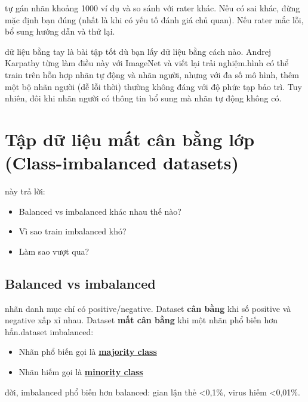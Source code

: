 \documentclass[12pt,a4paper]{article}
\begin{document}
\begin{luuy}[title={Luôn double-check người gán nhãn}] tự gán nhãn khoảng 1000 ví dụ và so sánh với rater khác. Nếu có sai khác, đừng mặc định bạn đúng (nhất là khi có yếu tố đánh giá chủ quan). Nếu rater mắc lỗi, bổ sung hướng dẫn và thử lại.\n\end{luuy}

\begin{ynghia} dữ liệu bằng tay là bài tập tốt dù bạn lấy dữ liệu bằng cách nào. Andrej Karpathy từng làm điều này với ImageNet và viết lại trải nghiệm.\n{} hình có thể train trên hỗn hợp nhãn tự động và nhãn người, nhưng với đa số mô hình, thêm một bộ nhãn người (dễ lỗi thời) thường không đáng với độ phức tạp bảo trì. Tuy nhiên, đôi khi nhãn người có thông tin bổ sung mà nhãn tự động không có.\n\end{ynghia}

\section{Tập dữ liệu mất cân bằng lớp (Class-imbalanced datasets)}

\begin{ynghia} này trả lời:\n\begin{itemize}\n  \item Balanced vs imbalanced khác nhau thế nào?\n  \item Vì sao train imbalanced khó?\n  \item Làm sao vượt qua?\n\end{itemize}\n\end{ynghia}

\subsection{Balanced vs imbalanced}

\begin{dinhnghia}[title={Balanced / Imbalanced}] nhãn danh mục chỉ có positive/negative. Dataset \textbf{cân bằng} khi số positive và negative xấp xỉ nhau. Dataset \textbf{mất cân bằng} khi một nhãn phổ biến hơn hẳn.\n\nTrong dataset imbalanced:\n\begin{itemize}\n  \item Nhãn phổ biến gọi là \href{https://developers.google.com/machine-learning/glossary\#majority_class}{\textbf{majority class}}\n  \item Nhãn hiếm gọi là \href{https://developers.google.com/machine-learning/glossary\#minority_class}{\textbf{minority class}}\n\end{itemize} đời, imbalanced phổ biến hơn balanced: gian lận thẻ <0{,}1\%, virus hiếm <0{,}01\%.\n\end{dinhnghia}
\end{document}
